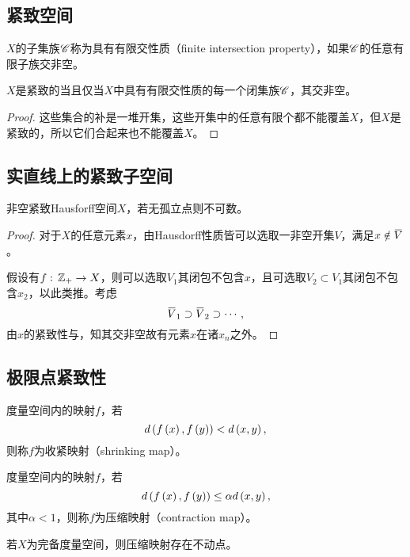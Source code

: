 \documentclass{ctexrep}
\begin{document}
  \subsection{紧致空间}
  \begin{definition}
    $X$的子集族$\mathscr{C}$称为具有有限交性质（finite intersection property），如果$\mathscr{C}$的任意有限子族交非空。
  \end{definition}
  \begin{theorem}
    \label{thm:finiteinters}
    $X$是紧致的当且仅当$X$中具有有限交性质的每一个闭集族$\mathscr{C}$，其交非空。
  \end{theorem}
  \begin{proof}
    这些集合的补是一堆开集，这些开集中的任意有限个都不能覆盖$X$，但$X$是紧致的，所以它们合起来也不能覆盖$X$。
  \end{proof}
  \subsection{实直线上的紧致子空间}
  \begin{theorem}
    \label{thm:uncountableR}
    非空紧致Hausforff空间$X$，若无孤立点则不可数。
  \end{theorem}
  \begin{proof}
    对于$X$的任意元素$x$，由Hausdorff性质皆可以选取一非空开集$V$，满足$x \notin \clo{V}$。\par
    假设有$f:\, \mathbb{Z}_+ \rightarrow X$，则可以选取$V_1$其闭包不包含$x$，且可选取$V_2 \subset V_1$其闭包不包含$x_2$，以此类推。考虑
    \[ \clo{V}_1 \supset \clo{V}_2 \supset \cdots, \]
    由$x$的紧致性与，知其交非空故有元素$x$在诸$x_n$之外。
  \end{proof}
  \subsection{极限点紧致性}
  \begin{definition}
    度量空间内的映射$f$，若
    \[ d\left(f\left(x\right),f\left(y\right)\right) < d\left(x,y\right), \]
    则称$f$为收紧映射（shrinking map）。
  \end{definition}
    \begin{definition}
    度量空间内的映射$f$，若
    \[ d\left(f\left(x\right),f\left(y\right)\right) \le \alpha d\left(x,y\right), \]
    其中$\alpha < 1$，则称$f$为压缩映射（contraction map）。
  \end{definition}
  \begin{theorem}
    \label{thm:fixp0}
    若$X$为完备度量空间，则压缩映射存在不动点。
  \end{theorem}


 
\ifx\allfiles\undefined %
\end{document}
